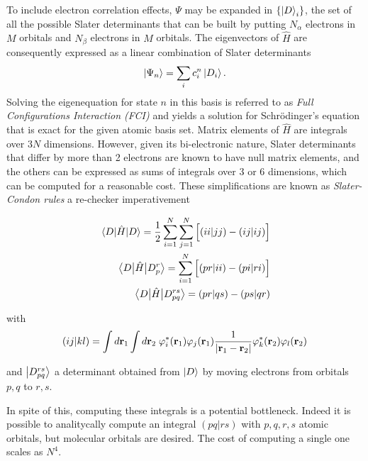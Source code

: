 \documentclass[./thesis.tex]{subfiles}
\begin{document}
To include electron correlation effects, $\Psi$ may be expanded in
$\{\ket D_i \}$, the set of all the possible Slater determinants that can be built by putting $N_\alpha$ electrons in $M$ orbitals and $N_\beta$ electrons in $M$ orbitals.
The eigenvectors of $\widehat{H}$ are consequently expressed as a linear combination of Slater determinants 
\begin{equation}
\ket{\Psi_n} = \sum_{i} c_i^n \ket{D_i}.
\end{equation}
Solving the eigenequation for state $n$ in this basis is referred to as \emph{Full Configurations Interaction (FCI)} and yields a solution for Schrödinger's equation that is exact for the given atomic basis set.
Matrix elements of $\widehat H$ are integrals over $3N$ dimensions. However, given its bi-electronic nature, Slater determinants that differ by more than 2 electrons are known to have null matrix elements, and the others can be expressed as sums of integrals over \alert{3 or 6} dimensions, which can be computed for a reasonable cost. These simplifications are known as \emph{Slater-Condon rules} \alert{a re-checker imperativement}

\begin{align}
\mel{D}{\hat{H}}{D} = \frac{1}{2} \sum_{i=1}^N \sum_{j=1}^N \Big [ (ii|jj) - (ij|ij) \Big ]      \\
\mel{D}{\hat{H}}{D_p^r} = \sum_{i=1}^N \Big [ (pr|ii) - (pi|ri) \Big ]      \\
\mel{D}{\hat{H}}{D_{pq}^{rs}} = (pr|qs) - (ps|qr)
\end{align}

with
\begin{equation}
(ij|kl) = \int d{\bf r}_1 \int d{\bf r}_2 \; \varphi^*_i({\bf r}_1)\varphi_j({\bf r}_1) \frac{1}{|{\bf r}_1 - {\bf r}_2|} \varphi^*_k({\bf r}_2)\varphi_l({\bf r}_2)
\end{equation}

and $\ket {D_{pq}^{rs}}$ a determinant obtained from $\ket D$ by moving electrons from \alert{orbitals} $p,q$ to $r,s$.

In spite of this, computing these integrals is a potential bottleneck. Indeed it is possible to analitycally compute an integral $(pq|rs)$ with $p,q,r,s$ atomic orbitals, but molecular orbitals are desired. The cost of computing a single one scales as $N^4$.
\end{document}
